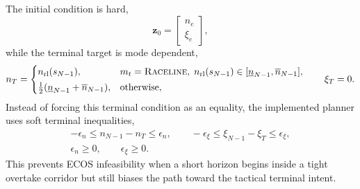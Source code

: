 \documentclass{iopjournal}
\begin{document}
The initial condition is hard,
\begin{equation}
\bm z_0=\begin{bmatrix}n_e\\ \xi_e\end{bmatrix},
\label{eq:path_initial}
\end{equation}
while the terminal target is mode dependent,
\begin{equation}
n_T=
\begin{cases}
n_{\rm rl}(s_{N-1}), &
m_t=\textsc{Raceline},\;
n_{\rm rl}(s_{N-1})\in[\underline n_{N-1},\overline n_{N-1}],\\[2pt]
\frac12(\underline n_{N-1}+\overline n_{N-1}), & \text{otherwise},
\end{cases}
\qquad \xi_T=0 .
\label{eq:terminal_mode}
\end{equation}
Instead of forcing this terminal condition as an equality, the implemented
planner uses soft terminal inequalities,
\begin{equation}
\begin{aligned}
-\epsilon_n\le n_{N-1}-n_T\le \epsilon_n,\qquad
-\epsilon_\xi\le \xi_{N-1}-\xi_T\le \epsilon_\xi,\\
\epsilon_n\ge0,\qquad \epsilon_\xi\ge0 .
\end{aligned}
\label{eq:terminal_slack}
\end{equation}
This prevents ECOS infeasibility when a short horizon begins inside a tight
overtake corridor but still biases the path toward the tactical terminal
intent.
\end{document}
